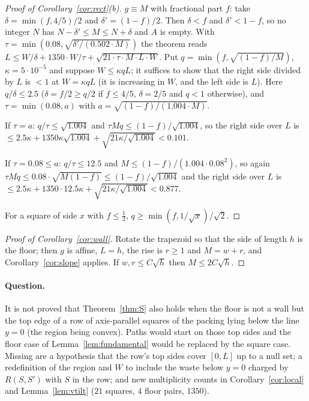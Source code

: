 \documentclass[11pt,letterpaper]{amsart}
\theoremstyle{plain}
\theoremstyle{definition}
\theoremstyle{remark}
\begin{document}
\begin{proof}[Proof of Corollary~\ref{cor:rect}(b)]
$g\equiv M$ with fractional part $f$: take $\delta=\min(f,4/5)/2$ and $\delta'=(1-f)/2$. Then $\delta<f$ and $\delta'<1-f$, so no integer $N$ has $N-\delta'\le M\le N+\delta$ and $A$ is empty. With $\tau=\min(0.08,\sqrt{\delta'/(0.502\cdot M)})$ the theorem reads $L\le W/\delta+1350\cdot W/\tau+\sqrt{21\cdot\tau\cdot M\cdot L\cdot W}$. Put $q=\min(f,\sqrt{(1-f)/M})$, $\kappa=5\cdot10^{-5}$ and suppose $W\le\kappa qL$; it suffices to show that the right side divided by $L$ is $<1$ at $W=\kappa qL$ (it is increasing in $W$, and the left side is $L$). Here $q/\delta\le2.5$ ($\delta=f/2\ge q/2$ if $f\le4/5$, $\delta=2/5$ and $q<1$ otherwise), and $\tau=\min(0.08,a)$ with $a=\sqrt{(1-f)/(1.004\cdot M)}$.

If $\tau=a$: $q/\tau\le\sqrt{1.004}$ and $\tau Mq\le(1-f)/\sqrt{1.004}$, so the right side over $L$ is $\le2.5\kappa+1350\kappa\sqrt{1.004}+\sqrt{21\kappa/\sqrt{1.004}}<0.101$.

If $\tau=0.08\le a$: $q/\tau\le12.5$ and $M\le(1-f)/(1.004\cdot0.08^2)$, so again $\tau Mq\le0.08\cdot\sqrt{M(1-f)}\le(1-f)/\sqrt{1.004}$ and the right side over $L$ is $\le2.5\kappa+1350\cdot12.5\kappa+\sqrt{21\kappa/\sqrt{1.004}}<0.877$.

For a square of side $x$ with $f\le\tfrac12$, $q\ge\min(f,1/\sqrt x)/\sqrt2$.
\end{proof}

\begin{proof}[Proof of Corollary~\ref{cor:wall}]
Rotate the trapezoid so that the side of length $h$ is the floor; then $g$ is affine, $L=h$, the rise is $r\ge1$ and $M=w+r$, and Corollary~\ref{cor:slope} applies. If $w,r\le C\sqrt h$ then $M\le2C\sqrt h$.
\end{proof}

\paragraph{Question.}
It is not proved that Theorem~\ref{thm:S} also holds when the floor is not a wall but the top edge of a row of axis-parallel squares of the packing lying below the line $y=0$ (the region being convex). Paths would start on those top sides and the floor case of Lemma~\ref{lem:fundamental} would be replaced by the square case. Missing are a hypothesis that the row's top sides cover $[0,L]$ up to a null set; a redefinition of the region and $W$ to include the waste below $y=0$ charged by $R(S,S')$ with $S$ in the row; and new multiplicity counts in Corollary~\ref{cor:local} and Lemma~\ref{lem:vtilt} ($21$ squares, $4$ floor pairs, $1350$).
\end{document}
